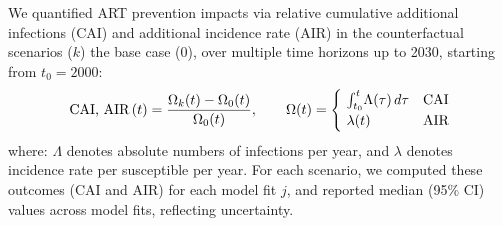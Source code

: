 \par
We quantified ART prevention impacts via relative
cumulative additional infections (CAI) and additional incidence rate (AIR)
in the counterfactual scenarios ($k$) \vs the base case ($0$),
over multiple time horizons up to 2030, starting from $t_0 = 2000$:
\begin{equation}
  \textnormal{CAI, AIR}\,(t) = \frac{\Omega_{k}(t) - \Omega_{0}(t)}{\Omega_{0}(t)}
  ,\qquad \Omega(t) =
  \begin{cases}
    ~\int_{t_0}^{t}\!\Lambda(\tau)\,d\tau & \textnormal{CAI} \\
    ~\lambda(t) & \textnormal{AIR}
  \end{cases}
\end{equation} where:
$\Lambda$ denotes absolute numbers of infections per year, and
$\lambda$ denotes incidence rate per susceptible per year.
For each scenario, we computed these outcomes (CAI and AIR) for each model fit $j$,
and reported median (95\% CI) values across model fits, reflecting uncertainty.
